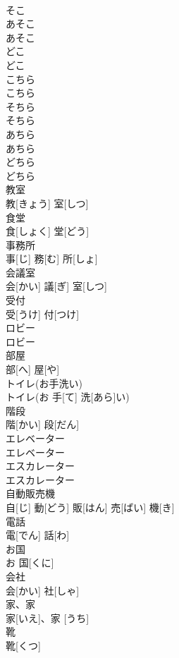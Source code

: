 \documentclass[8pt]{extreport}
\begin{document}
\begin{CJK}{UTF8}{min}
\\	そこ		
\\	あそこ	
\\	あそこ		
\\	どこ	
\\	どこ		
\\	こちら	
\\	こちら		
\\	そちら	
\\	そちら		
\\	あちら	
\\	あちら		
\\	どちら	
\\	どちら		
\\	教室	
\\	教[きょう] 室[しつ]		
\\	食堂	
\\	食[しょく] 堂[どう]		
\\	事務所	
\\	事[じ] 務[む] 所[しょ]		
\\	会議室	
\\	会[かい] 議[ぎ] 室[しつ]		
\\	受付	
\\	受[うけ] 付[つけ]		
\\	ロビー	
\\	ロビー		
\\	部屋	
\\	部[へ] 屋[や]		
\\	トイレ(お手洗い)	
\\	トイレ(お 手[て] 洗[あら]い)		
\\	階段	
\\	階[かい] 段[だん]		
\\	エレベーター	
\\	エレベーター		
\\	エスカレーター	
\\	エスカレーター		
\\	自動販売機	
\\	自[じ] 動[どう] 販[はん] 売[ばい] 機[き]		
\\	電話	
\\	電[でん] 話[わ]		
\\	お国	
\\	お 国[くに]		
\\	会社	
\\	会[かい] 社[しゃ]		
\\	家、家	
\\	家[いえ]、家 [うち]		
\\	靴	
\\	靴[くつ]		

\end{CJK}
\end{document}
